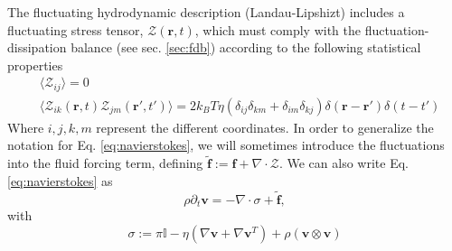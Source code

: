 \documentclass[ twoside,openright,titlepage,numbers=noenddot,%
headinclude,footinclude,cleardoublepage=empty,abstract=on,
BCOR=5mm,paper=b5,fontsize=11pt, dvipsnames
]{scrreprt}
\renewcommand{\vec}[1]{\bm{#1}}
\newcommand{\tens}[1]{\bm{\mathcal{#1}}}
\newcommand{\kT}{k_B T}
\newcommand{\fpos}{r}
\newcommand{\fvel}{v}
\begin{document}
The fluctuating hydrodynamic description (Landau-Lipshizt) includes a fluctuating stress tensor, $\mathcal{Z}(\vec{\fpos}, t)$, which must comply with the fluctuation-dissipation balance (see sec. \ref{sec:fdb}) according to the following statistical properties~\cite{Zarate2006}
\begin{equation}
  \label{eq:navierstkesnoise}
  \begin{aligned}
&  \langle \mathcal Z_{ij}\rangle = 0\\
&  \langle \mathcal Z_{ik}(\vec{\fpos},t)\mathcal Z_{jm}(\vec{\fpos}',t')\rangle = 2\kT\eta(\delta_{ij}\delta_{km} + \delta_{im}\delta_{kj})\delta(\vec{\fpos}-\vec{\fpos}')\delta(t-t')
\end{aligned}
\end{equation}
Where $i,j,k,m$ represent the different coordinates.
In order to generalize the notation for Eq. \eqref{eq:navierstokes}, we will sometimes introduce the fluctuations into the fluid forcing term, defining $\tilde{\vec{f}} := \vec{f} + \nabla\cdot\mathcal{Z}$.
We can also write Eq. \eqref{eq:navierstokes} as
\begin{equation}
  \label{eq:navierstokes2}
  \rho\partial_t\vec{\fvel} = -\nabla\cdot \tens{\sigma} + \tilde{\vec{f}},
\end{equation}
with
\begin{equation}
  \tens{\sigma} := \pi\mathbb{I} - \eta\left(\nabla \vec{\fvel} + \nabla\vec{\fvel}^T\right) + \rho\left(\vec{\fvel}\otimes\vec{\fvel}\right)
\end{equation}
\end{document}
